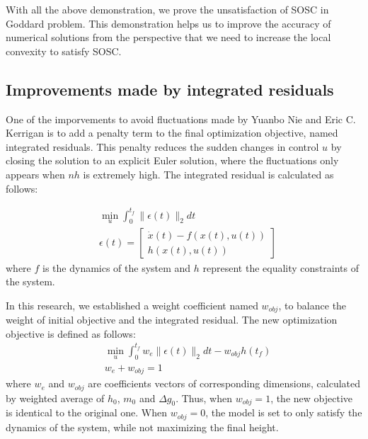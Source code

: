 \documentclass{article}
\begin{document}
With all the above demonstration, we prove the unsatisfaction of SOSC in Goddard problem. This demonstration helps us to improve the accuracy of numerical solutions from the perspective that we need to increase the local convexity to satisfy SOSC.
\subsection{Improvements made by integrated residuals}
\label{sec:Imp}
One of the imporvements to avoid fluctuations made by Yuanbo Nie and Eric C. Kerrigan\cite{Solving Dynamic Optimization} is to add a penalty term to the final optimization objective, named integrated residuals. This penalty reduces the sudden changes in control $u$ by closing the solution to an explicit Euler solution, where the fluctuations only appears when $nh$ is extremely high. The integrated residual is calculated as follows:

\[
\begin{aligned}
    &\min_{u}\int_0^{t_f}\|\epsilon(t)\|_{2}dt \\
    &\epsilon(t)=\left[\begin{matrix}
        \dot{x}(t)-f(x(t),u(t)) \\ h(x(t),u(t))
    \end{matrix}\right]
\end{aligned}
\]
where $f$ is the dynamics of the system and $h$ represent the equality constraints of the system.

In this research, we established a weight coefficient named $w_{obj}$, to balance the weight of initial objective and the integrated residual. The new optimization objective is defined as follows:
\[
\begin{aligned}
    &\min_{u}\int_0^{t_f}w_{e}\|\epsilon(t)\|_{2}dt - w_{obj}h(t_f) \\
    &w_{e}+ w_{obj}=1
\end{aligned}
\]
where $w_{e}$ and $w_{obj}$ are coefficients vectors of corresponding dimensions, calculated by weighted average of $h_0$, $m_0$ and $\Delta g_0$. Thus, when $w_{obj}=1$, the new objective is identical to the original one. When $w_{obj}=0$, the model is set to only satisfy the dynamics of the system, while not maximizing the final height.
\end{document}
